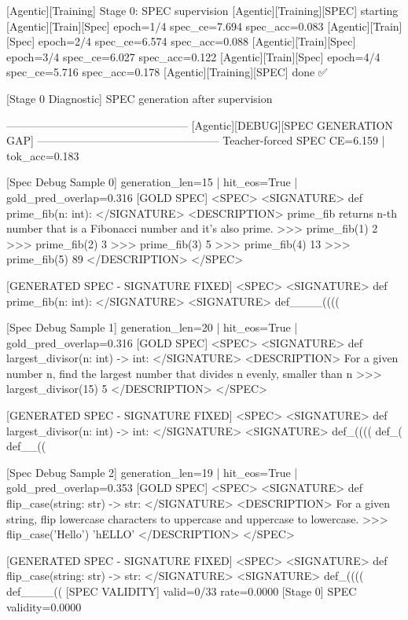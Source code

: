 [Agentic][Training] Stage 0: SPEC supervision
[Agentic][Training][SPEC] starting
[Agentic][Train][Spec] epoch=1/4 spec_ce=7.694 spec_acc=0.083
[Agentic][Train][Spec] epoch=2/4 spec_ce=6.574 spec_acc=0.088
[Agentic][Train][Spec] epoch=3/4 spec_ce=6.027 spec_acc=0.122
[Agentic][Train][Spec] epoch=4/4 spec_ce=5.716 spec_acc=0.178
[Agentic][Training][SPEC] done ✅

[Stage 0 Diagnostic] SPEC generation after supervision

--------------------------------------------------
[Agentic][DEBUG][SPEC GENERATION GAP]
--------------------------------------------------
Teacher-forced SPEC CE=6.159 | tok_acc=0.183

[Spec Debug Sample 0]
generation_len=15 | hit_eos=True | gold_pred_overlap=0.316
[GOLD SPEC]
<SPEC> <SIGNATURE> def prime_fib(n: int): </SIGNATURE> <DESCRIPTION> prime_fib returns n-th number that is a Fibonacci number and it's also prime. >>> prime_fib(1) 2 >>> prime_fib(2) 3 >>> prime_fib(3) 5 >>> prime_fib(4) 13 >>> prime_fib(5) 89 </DESCRIPTION> </SPEC>

[GENERATED SPEC - SIGNATURE FIXED]
<SPEC>
<SIGNATURE>
def prime_fib(n: int):
</SIGNATURE>
<SIGNATURE> def____((((

[Spec Debug Sample 1]
generation_len=20 | hit_eos=True | gold_pred_overlap=0.316
[GOLD SPEC]
<SPEC> <SIGNATURE> def largest_divisor(n: int) -> int: </SIGNATURE> <DESCRIPTION> For a given number n, find the largest number that divides n evenly, smaller than n >>> largest_divisor(15) 5 </DESCRIPTION> </SPEC>

[GENERATED SPEC - SIGNATURE FIXED]
<SPEC>
<SIGNATURE>
def largest_divisor(n: int) -> int:
</SIGNATURE>
<SIGNATURE> def_(((( def_( def__((

[Spec Debug Sample 2]
generation_len=19 | hit_eos=True | gold_pred_overlap=0.353
[GOLD SPEC]
<SPEC> <SIGNATURE> def flip_case(string: str) -> str: </SIGNATURE> <DESCRIPTION> For a given string, flip lowercase characters to uppercase and uppercase to lowercase. >>> flip_case('Hello') 'hELLO' </DESCRIPTION> </SPEC>

[GENERATED SPEC - SIGNATURE FIXED]
<SPEC>
<SIGNATURE>
def flip_case(string: str) -> str:
</SIGNATURE>
<SIGNATURE> def_(((( def____((
[SPEC VALIDITY] valid=0/33 rate=0.0000
[Stage 0] SPEC validity=0.0000

